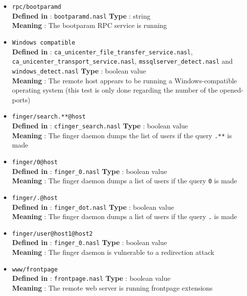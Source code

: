 \documentclass{article}
\begin{document}
\begin{itemize}
\item \verb+rpc/bootparamd+\\
\textbf{Defined in} : \verb+bootparamd.nasl+
\textbf{Type} : string\\
\textbf{Meaning} : The bootparam RPC service is running

\item \verb+Windows compatible+\\
\textbf{Defined in} : \verb+ca_unicenter_file_transfer_service.nasl+,
\verb+ca_unicenter_transport_service.nasl+, \verb+mssqlserver_detect.nasl+ and
\verb+windows_detect.nasl+
\textbf{Type} : boolean value\\
\textbf{Meaning} : The remote host appears to be running a Windows-compatible
operating system (this test is only done regarding the number of the
opened-ports)


\item \verb+finger/search.**@host+\\
\textbf{Defined in} : \verb+cfinger_search.nasl+
\textbf{Type} : boolean value\\
\textbf{Meaning} : The finger daemon dumps the list of users
if the query \verb+.**+ is made

\item \verb+finger/0@host+\\
\textbf{Defined in} : \verb+finger_0.nasl+
\textbf{Type} : boolean value\\
\textbf{Meaning} : The finger daemon dumps a list of users
if the query \verb+0+ is made

\item \verb+finger/.@host+\\
\textbf{Defined in} : \verb+finger_dot.nasl+
\textbf{Type} : boolean value\\
\textbf{Meaning} : The finger daemon dumps a list of users
if the query \verb+.+ is made

\item \verb+finger/user@host1@host2+\\
\textbf{Defined in} : \verb+finger_0.nasl+
\textbf{Type} : boolean value\\
\textbf{Meaning} : The finger daemon is vulnerable to a redirection attack

\item \verb+www/frontpage+\\
\textbf{Defined in} : \verb+frontpage.nasl+
\textbf{Type} : boolean value\\
\textbf{Meaning} : The remote web server is running frontpage extensions


\end{itemize}
\end{document}
